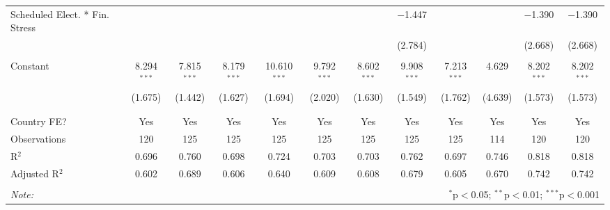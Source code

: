 \begin{table}[!htbp]
\begin{tabular}{@{\extracolsep{5pt}}lccccccccccc}
 Scheduled Elect. * Fin. Stress &  &  &  &  &  &  & $-$1.447 &  &  & $-$1.390 & $-$1.390 \\ 
  &  &  &  &  &  &  & (2.784) &  &  & (2.668) & (2.668) \\ 
  & & & & & & & & & & & \\ 
 Constant & 8.294$^{***}$ & 7.815$^{***}$ & 8.179$^{***}$ & 10.610$^{***}$ & 9.792$^{***}$ & 8.602$^{***}$ & 9.908$^{***}$ & 7.213$^{***}$ & 4.629 & 8.202$^{***}$ & 8.202$^{***}$ \\ 
  & (1.675) & (1.442) & (1.627) & (1.694) & (2.020) & (1.630) & (1.549) & (1.762) & (4.639) & (1.573) & (1.573) \\ 
  & & & & & & & & & & & \\ 
\hline \\[-1.8ex] 
Country FE? & Yes & Yes & Yes & Yes & Yes & Yes & Yes & Yes & Yes & Yes & Yes \\ 
Observations & 120 & 125 & 125 & 125 & 125 & 125 & 125 & 125 & 114 & 120 & 120 \\ 
R$^{2}$ & 0.696 & 0.760 & 0.698 & 0.724 & 0.703 & 0.703 & 0.762 & 0.697 & 0.746 & 0.818 & 0.818 \\ 
Adjusted R$^{2}$ & 0.602 & 0.689 & 0.606 & 0.640 & 0.609 & 0.608 & 0.679 & 0.605 & 0.670 & 0.742 & 0.742 \\ 
\hline 
\hline \\[-1.8ex] 
\textit{Note:}  & \multicolumn{11}{r}{$^{*}$p$<$0.05; $^{**}$p$<$0.01; $^{***}$p$<$0.001} \\ 
\end{tabular} 
\end{table} 
